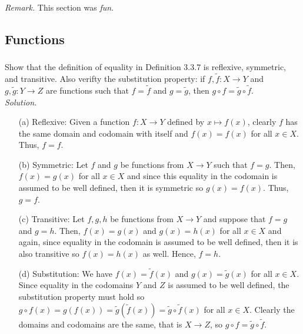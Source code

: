 \documentclass{amsart}
\theoremstyle{definition}
\newcommand{\soln}{\newline\textit{Solution.} }
\begin{document}
\textit{Remark.} This section was \textit{fun}. \\


\subsection{Functions}

\subsubsection{} Show that the definition of equality in Definition 3.3.7 is reflexive, symmetric, and transitive. Also verifty the substitution property: if $f,\tilde{f}:X\to Y$ and $g,\tilde{g}:Y\to Z$ are functions such that $f=\tilde{f}$ and $g=\tilde{g}$, then $g\circ f=\tilde{g}\circ\tilde{f}$. \\
\soln 
\begin{enumerate}
\item[(a)] Reflexive: Given a function $f:X\to Y$ defined by $x\mapsto f(x)$, clearly $f$ has the same domain and codomain with itself and $f(x)=f(x)$ for all $x\in X$. Thus, $f=f$. 
\item[(b)] Symmetric: Let $f$ and $g$ be functions from $X\to Y$ such that $f=g$. Then, $f(x)=g(x)$ for all $x\in X$ and since this equality in the codomain is assumed to be well defined, then it is symmetric so $g(x)=f(x)$. Thus, $g=f$.
\item[(c)] Transitive: Let $f,g,h$ be functions from $X\to Y$ and suppose that $f=g$ and $g=h$. Then, $f(x)=g(x)$ and $g(x)=h(x)$ for all $x\in X$ and again, since equality in the codomain is assumed to be well defined, then it is also transitive so $f(x)=h(x)$ as well. Hence, $f=h$.
\item[(d)] Substitution: We have $f(x)=\tilde{f}(x)$ and $g(x)=\tilde{g}(x)$ for all $x\in X$. Since equality in the codomains $Y$ and $Z$ is assumed to be well defined, the substitution property must hold so $g\circ f(x)=g(f(x))=\tilde{g}(\tilde{f}(x))=\tilde{g}\circ\tilde{f}(x)$ for all $x\in X$. Clearly the domains and codomains are the same, that is $X\to Z$, so $g\circ f=\tilde{g}\circ\tilde{f}$. \\
\end{enumerate}
\end{document}
